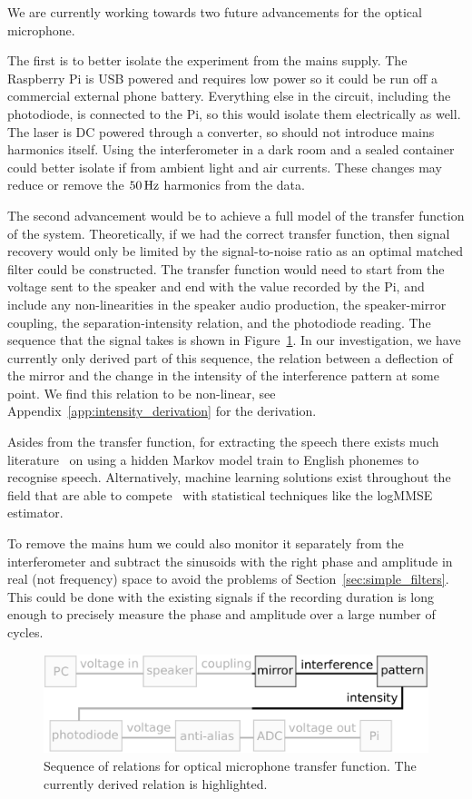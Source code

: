\documentclass[paper-main.tex]{subfiles}
\begin{document}

We are currently working towards two future advancements for the optical microphone.


The first is to better isolate the experiment from the mains supply. 
The Raspberry Pi is USB powered and requires low power so it could be run off a commercial external phone battery. 
Everything else in the circuit, including the photodiode, is connected to the Pi, so this would isolate them electrically as well. 
The laser is DC powered through a converter, so should not introduce mains harmonics itself. 
Using the interferometer in a dark room and a sealed container could better isolate if from ambient light and air currents.
These changes may reduce or remove the $50\,{\rm Hz}$ harmonics from the data.


The second advancement would be to achieve a full model of the transfer function of the system. 
Theoretically, if we had the correct transfer function, then signal recovery would only be limited by the signal-to-noise ratio as an optimal matched filter could be constructed.
The transfer function would need to start from the voltage sent to the speaker and end with the value recorded by the Pi, and include any non-linearities in the speaker audio production, the speaker-mirror coupling, the separation-intensity relation, and the photodiode reading. 
The sequence that the signal takes is shown in Figure~\ref{fig:pipeline_highlighted}.
In our investigation, we have currently only derived part of this sequence, the relation between a deflection of the mirror and the change in the intensity of the interference pattern at some point. 
We find this relation to be non-linear, see Appendix~\ref{app:intensity_derivation} for the derivation.


Asides from the transfer function, for extracting the speech there exists much literature~\cite{HMM_english} on using a hidden Markov model train to English phonemes to recognise speech.
Alternatively, machine learning solutions exist throughout the field that are able to compete~\cite{SEGAN} with statistical techniques like the logMMSE estimator.

To remove the mains hum we could also monitor it separately from the interferometer and subtract the sinusoids with the right phase and amplitude in real (not frequency) space to avoid the problems of Section~\ref{sec:simple_filters}. 
This could be done with the existing signals if the recording duration is long enough to precisely measure the phase and amplitude over a large number of cycles.


\begin{figure}
	\includegraphics[width=.49\textwidth]{figures/pipeline_highlighted.pdf}
	\caption{Sequence of relations for optical microphone transfer function. The currently derived relation is highlighted.}
	\label{fig:pipeline_highlighted}
\end{figure}
\end{document}
